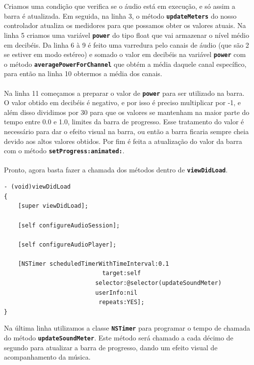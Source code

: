 \documentclass[a4paper,12pt,brazil,doubleside]{book}
\begin{document}
Criamos uma condição que verifica se o áudio está em execução, e só assim a barra é atualizada. Em seguida, na linha 3, o método \texttt{\textbf{updateMeters}} do nosso controlador atualiza os medidores para que possamos obter os valores atuais. Na linha 5 criamos uma variável \texttt{\textbf{power}} do tipo float que vai armazenar o nível médio em decibéis. Da linha 6 à 9 é feito uma varredura pelo canais de áudio (que são 2 se estiver em modo estéreo) e somado o valor em decibéis na variável \texttt{\textbf{power}} com o método \texttt{\textbf{averagePowerForChannel}} que obtém a média daquele canal específico, para então na linha 10 obtermos a média dos canais.
\paragraph{}Na linha 11 começamos a preparar o valor de \texttt{\textbf{power}} para ser utilizado na barra. O valor obtido em decibéis é negativo, e por isso é preciso multiplicar por -1, e além disso dividimos por 30 para que os valores se mantenham na maior parte do tempo entre 0.0 e 1.0, limites da barra de progresso. Esse tratamento do valor é necessário para dar o efeito visual na barra, ou então a barra ficaria sempre cheia devido aos altos valores obtidos. Por fim é feita a atualização do valor da barra com o método \texttt{\textbf{setProgress:animated:}}.
\paragraph{}Pronto, agora basta fazer a chamada dos métodos dentro de \texttt{\textbf{viewDidLoad}}.

\begin{listing}
\begin{verbatim}
- (void)viewDidLoad
{
    [super viewDidLoad];
    
    [self configureAudioSession];
    
    [self configureAudioPlayer];
    
    [NSTimer scheduledTimerWithTimeInterval:0.1
                            target:self
                          selector:@selector(updateSoundMeter)
                          userInfo:nil
                           repeats:YES];
}
\end{verbatim}
\end{listing}

Na última linha utilizamos a classe \texttt{\textbf{NSTimer}} para programar o tempo de chamada do método \texttt{\textbf{updateSoundMeter}}. Este método será chamado a cada décimo de segundo para atualizar a barra de progresso, dando um efeito visual de acompanhamento da música.
\end{document}
